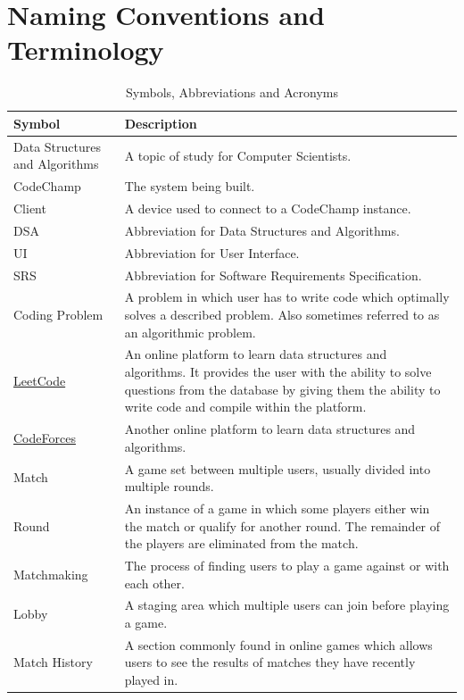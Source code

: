 \documentclass[12pt, titlepage]{article}
\begin{document}
\section*{Naming Conventions and Terminology}
\begin{table}[H]
\begin{center}
\begin{tabular}{|p{3cm}|p{9cm}|}
\hline
  \textbf{Symbol} & \textbf{Description}\\
  \hline
  Data Structures and Algorithms & A topic of study for Computer Scientists.\\
  \hline
  CodeChamp & The system being built.\\
  \hline
  Client & A device used to connect to a CodeChamp instance.\\
  \hline
  DSA & Abbreviation for Data Structures and Algorithms.\\
  \hline
  UI & Abbreviation for User Interface.\\
  \hline
  SRS & Abbreviation for Software Requirements Specification.\\
  \hline
  Coding Problem & A problem in which user has to write code which optimally solves a described problem. Also sometimes referred to as an algorithmic problem.\\
  \hline
  \href{http://www.leetcode.com}{LeetCode} \cite{leetcode} & An online platform to learn data structures and algorithms. It provides the user with the ability to solve questions from the database by giving them the ability to write code and compile within the platform.\\
  \hline
  \href{https://codeforces.com/}{CodeForces} \cite{codeforces} & Another online platform to learn data structures and algorithms.\\
  \hline
  Match & A game set between multiple users, usually divided into multiple rounds.\\
  \hline
  Round & An instance of a game in which some players either win the match or qualify for another round. The remainder of the players are eliminated from the match.\\
  \hline
  Matchmaking & The process of finding users to play a game against or with each other.\\
  \hline
  Lobby & A staging area which multiple users can join before playing a game.\\
  \hline
  Match History & A section commonly found in online games which allows users to see the results of matches they have recently played in.\\
  \hline
\end{tabular}
\end{center}
\caption{Symbols, Abbreviations and Acronyms}            

\end{table}
\newpage
\end{document}
